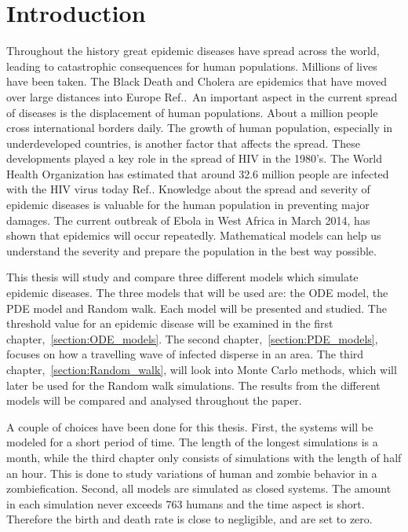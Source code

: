\documentclass[%
twoside,                 %
final,                   %
chapterprefix=true,      %
open=right               %
10pt]{book}
\begin{document}
\chapter{Introduction}
Throughout the history great epidemic diseases have spread across the world, leading to catastrophic consequences for human populations. Millions of lives have been taken. The Black Death and Cholera are epidemics that have moved over large distances into Europe Ref.\cite[p.~315]{murray2002mathematical}.~An important aspect in the current spread of diseases is the displacement of human populations. About a million people cross international borders daily. The growth of human population, especially in underdeveloped countries, is another factor that affects the spread. These developments played a key role in the spread of HIV in the 1980's. The World Health Organization has estimated that around 32.6 million people are infected with the HIV virus today Ref.\cite{who_hiv}. Knowledge about the spread and severity of epidemic diseases is valuable for the human population in preventing major damages. The current outbreak of Ebola in West Africa in March 2014, has shown that epidemics will occur repeatedly. Mathematical models can help us understand the severity and prepare the population in the best way possible.


\vspace{3mm}




\vspace{3mm}


This thesis will study and compare three different models which simulate epidemic diseases. The three models that will be used are: the ODE model, the PDE model and Random walk. Each model will be presented and studied. The threshold value for an epidemic disease will be examined in the first chapter,~\ref{section:ODE_models}. The second chapter,~\ref{section:PDE_models}, focuses on how a travelling wave of infected disperse in an area. The third chapter,~\ref{section:Random_walk}, will look into Monte Carlo methods, which will later be used for the Random walk simulations. The results from the different models will be compared and analysed throughout the paper.


\vspace{3mm}




\vspace{3mm}


A couple of choices have been done for this thesis. First, the systems will be modeled for a short period of time. The length of the longest simulations is a month, while the third chapter only consists of simulations with the length of half an hour. This is done to study variations of human and zombie behavior in a zombiefication. Second, all models are simulated as closed systems. The amount in each simulation never exceeds 763 humans and the time aspect is short. Therefore the birth and death rate is close to negligible, and are set to zero.    
\end{document}
